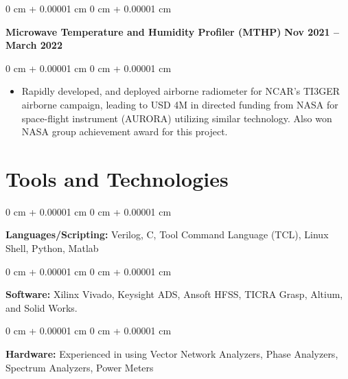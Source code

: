 \documentclass[10pt, letterpaper]{article}
\newenvironment{highlights}{
    \begin{itemize}[
        topsep=0.10 cm,
        parsep=0.10 cm,
        partopsep=0pt,
        itemsep=0pt,
        leftmargin=0 cm + 10pt     
    ]
}{
    \end{itemize}
} %
\newenvironment{onecolentry}{
    \begin{adjustwidth}{
        0 cm + 0.00001 cm
    }{
        0 cm + 0.00001 cm
    }
}{
    \end{adjustwidth}
} %
\newenvironment{twocolentry}[2][]{
    \onecolentry
    \def\secondColumn{#2}
    \setcolumnwidth{\fill, 4.5 cm}
    \begin{paracol}{2}
}{
    \switchcolumn \raggedleft \secondColumn
    \end{paracol}
    \endonecolentry
} %
\begin{document}
        \begin{twocolentry}{
            \textbf{Nov 2021 -- March 2022}
        }
            \textbf{Microwave Temperature and Humidity Profiler (MTHP)}\end{twocolentry}

        \vspace{0.20 cm}
        \begin{onecolentry}
            \begin{highlights}
                \item Rapidly developed, and deployed airborne radiometer for NCAR's TI3GER airborne campaign, leading to USD 4M in directed funding from NASA for space-flight instrument (AURORA) utilizing similar technology. Also won NASA group achievement award for this project.
            \end{highlights}
        \end{onecolentry}
        \vspace{0.3 cm}

    \section{Tools and Technologies}        
        \begin{onecolentry}
            \textbf{Languages/Scripting:} Verilog, C, Tool Command Language (TCL), Linux Shell, Python, Matlab
        \end{onecolentry}
        \vspace{0.2 cm}
        \begin{onecolentry}
            \textbf{Software:} Xilinx Vivado, Keysight ADS, Ansoft HFSS, TICRA Grasp, Altium, and Solid Works. 
        \end{onecolentry}
        \vspace{0.2 cm}
        \begin{onecolentry}
            \textbf{Hardware:}  Experienced in using Vector Network Analyzers, Phase Analyzers, Spectrum Analyzers, Power Meters
        \end{onecolentry} 

    
       


        
\end{document}
